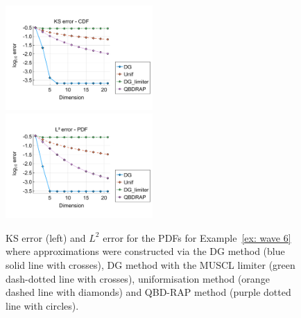 \begin{example}
\begin{figure}[h]
		\centering
		\includegraphics[width=0.5\textwidth,trim={0.75cm 0.8cm 0.25cm 1.25cm},clip]{chapter6/figs/wave/fun6/meshs_ks_error_formatted.pdf}%
		\includegraphics[width=0.5\textwidth,trim={0.75cm 0.8cm 0.25cm 1.25cm},clip]{chapter6/figs/wave/fun6/meshs_l2_pdf_error_formatted.pdf}
		\caption{KS error (left) and \(L^2\) error for the PDFs for Example~\ref{ex: wave 6} where approximations were constructed via the DG method (blue solid line with crosses), DG method with the MUSCL limiter (green dash-dotted line with crosses), uniformisation method (orange dashed line with diamonds) and QBD-RAP method (purple dotted line with circles).} 
		\label{fig: fun 6 wave} 
	\end{figure}
\exampleFloatBarrier
\end{example}

